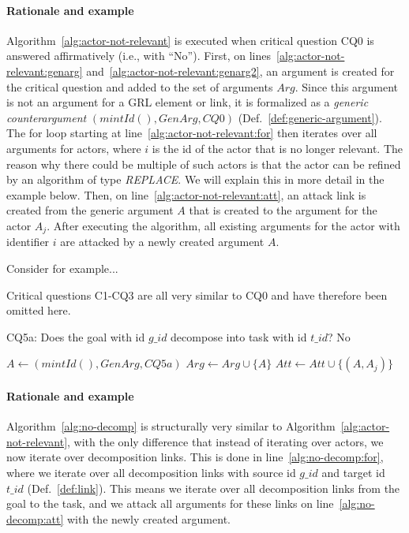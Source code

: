 \paragraph{Rationale and example} Algorithm~\ref{alg:actor-not-relevant} is executed when critical question CQ0 is answered affirmatively (i.e., with ``No''). First, on lines~\ref{alg:actor-not-relevant:genarg} and~\ref{alg:actor-not-relevant:genarg2}, an argument is created for the critical question and added to the set of arguments $Arg$. Since this argument is not an argument for a GRL element or link, it is formalized as a \emph{generic counterargument} $(mintId(), GenArg, CQ0)$ (Def.~\ref{def:generic-argument}). The for loop starting at line~\ref{alg:actor-not-relevant:for} then iterates over all arguments for actors, where $i$ is the id of the actor that is no longer relevant. The reason why there could be multiple of such actors is that the actor can be refined by an algorithm of type \emph{REPLACE}. We will explain this in more detail in the example below. Then, on line~\ref{alg:actor-not-relevant:att}, an attack link is created from the generic argument $A$ that is created to the argument for the actor $A_j$. After executing the algorithm, all existing arguments for the actor with identifier $i$ are attacked by a newly created argument $A$.

Consider for example...

Critical questions C1-CQ3 are all very similar to CQ0 and have therefore been omitted here.

\begin{algorithm}[h]
  \caption{CQ5a: Does the goal with id $g\_id$ decompose into task with id $t\_id$? No}\label{alg:no-decomp}
  \begin{algorithmic}[1]
    \State $A \leftarrow (mintId(),GenArg,CQ5a)$\label{alg:no-decomp:genarg}
    \State $Arg\leftarrow Arg \cup \{A\}$\label{alg:no-decomp:genarg2}
    \label{alg:no-decomp:for}
      \State $Att \leftarrow Att \cup \{(A,A_j)\}$\label{alg:no-decomp:att}
    \EndFor
    \EndProcedure
  \end{algorithmic}
\end{algorithm}

\paragraph{Rationale and example} Algorithm~\ref{alg:no-decomp} is structurally very similar to Algorithm~\ref{alg:actor-not-relevant}, with the only difference that instead of iterating over actors, we now iterate over decomposition links. This is done in line~\ref{alg:no-decomp:for}, where we iterate over all decomposition links with source id $g\_id$ and target id $t\_id$ (Def.~\ref{def:link}). This means we iterate over all decomposition links from the goal to the task, and we attack all arguments for these links on line~\ref{alg:no-decomp:att} with the newly created argument.

